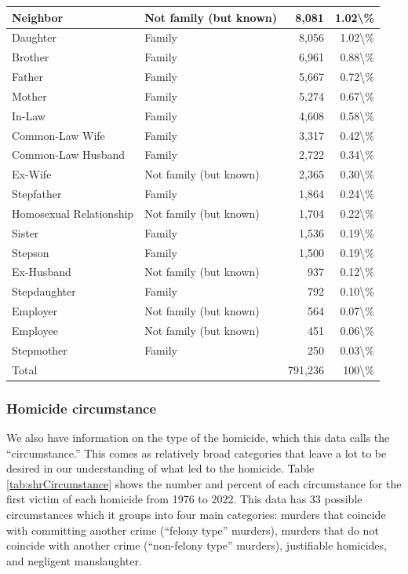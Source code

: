 \documentclass[
]{krantz}
\begin{document}
\begin{longtable}[t]{l|l|r|r}
\hline
Neighbor & Not family (but known) & 8,081 & 1.02\textbackslash{}\%\\
\hline
Daughter & Family & 8,056 & 1.02\textbackslash{}\%\\
\hline
Brother & Family & 6,961 & 0.88\textbackslash{}\%\\
\hline
Father & Family & 5,667 & 0.72\textbackslash{}\%\\
\hline
Mother & Family & 5,274 & 0.67\textbackslash{}\%\\
\hline
In-Law & Family & 4,608 & 0.58\textbackslash{}\%\\
\hline
Common-Law Wife & Family & 3,317 & 0.42\textbackslash{}\%\\
\hline
Common-Law Husband & Family & 2,722 & 0.34\textbackslash{}\%\\
\hline
Ex-Wife & Not family (but known) & 2,365 & 0.30\textbackslash{}\%\\
\hline
Stepfather & Family & 1,864 & 0.24\textbackslash{}\%\\
\hline
Homosexual Relationship & Not family (but known) & 1,704 & 0.22\textbackslash{}\%\\
\hline
Sister & Family & 1,536 & 0.19\textbackslash{}\%\\
\hline
Stepson & Family & 1,500 & 0.19\textbackslash{}\%\\
\hline
Ex-Husband & Not family (but known) & 937 & 0.12\textbackslash{}\%\\
\hline
Stepdaughter & Family & 792 & 0.10\textbackslash{}\%\\
\hline
Employer & Not family (but known) & 564 & 0.07\textbackslash{}\%\\
\hline
Employee & Not family (but known) & 451 & 0.06\textbackslash{}\%\\
\hline
Stepmother & Family & 250 & 0.03\textbackslash{}\%\\
\hline
Total &  & 791,236 & 100\textbackslash{}\%\\
\hline
\end{longtable}

\subsubsection{Homicide circumstance}\label{circumstance}

We also have information on the type of the homicide, which
this data calls the ``circumstance.'' This comes as
relatively broad categories that leave a lot to be desired
in our understanding of what led to the homicide. Table
\ref{tab:shrCircumstance} shows the number and percent of
each circumstance for the first victim of each homicide from
1976 to 2022. This data has 33 possible circumstances which
it groups into four main categories: murders that coincide
with committing another crime (``felony type'' murders),
murders that do not coincide with another crime
(``non-felony type'' murders), justifiable homicides, and
negligent manslaughter.
\end{document}
